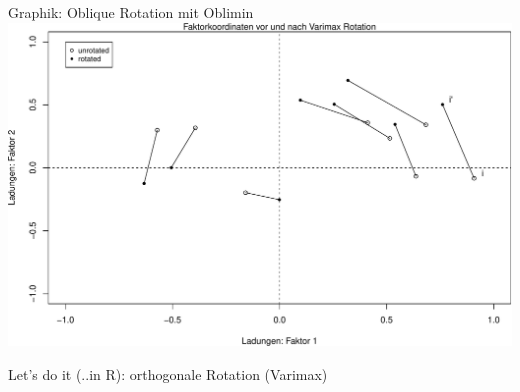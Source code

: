 \documentclass[
  ignorenonframetext,
]{beamer}
\newenvironment{Shaded}{\begin{snugshade}}{\end{snugshade}}
\newcommand{\AttributeTok}[1]{\textcolor[rgb]{0.77,0.63,0.00}{#1}}
\newcommand{\CommentTok}[1]{\textcolor[rgb]{0.56,0.35,0.01}{\textit{#1}}}
\newcommand{\DecValTok}[1]{\textcolor[rgb]{0.00,0.00,0.81}{#1}}
\newcommand{\FunctionTok}[1]{\textcolor[rgb]{0.00,0.00,0.00}{#1}}
\newcommand{\NormalTok}[1]{#1}
\newcommand{\OtherTok}[1]{\textcolor[rgb]{0.56,0.35,0.01}{#1}}
\newcommand{\SpecialCharTok}[1]{\textcolor[rgb]{0.00,0.00,0.00}{#1}}
\newcommand{\StringTok}[1]{\textcolor[rgb]{0.31,0.60,0.02}{#1}}
\begin{document}
\begin{frame}{Graphik: Oblique Rotation mit Oblimin}
\protect\hypertarget{graphik-oblique-rotation-mit-oblimin}{}
\includegraphics{06-EFA_files/figure-beamer/unnamed-chunk-7-1.pdf}
\end{frame}

\begin{frame}[fragile]{Let's do it (..in R): orthogonale Rotation
(Varimax)}
\protect\hypertarget{lets-do-it-..in-r-orthogonale-rotation-varimax}{}
\begin{Shaded}
\end{Shaded}
\end{frame}
\end{document}
